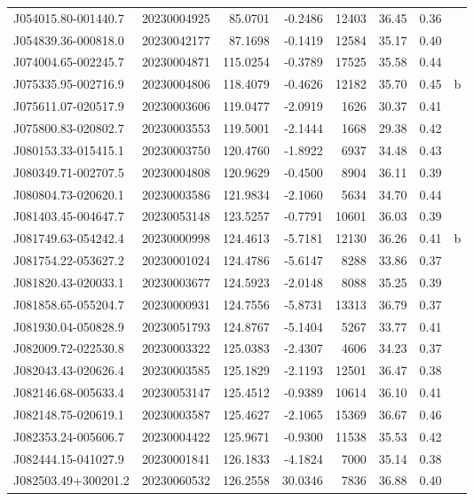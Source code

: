 \documentclass{article}
\begin{document}
\begin {longtable}{|l|l|r|r|r|r|r|l|}
 J054015.80-001440.7&  20230004925&   85.0701&   -0.2486& 12403& 36.45& 0.36&\\
 J054839.36-000818.0&  20230042177&   87.1698&   -0.1419& 12584& 35.17& 0.40&\\
 J074004.65-002245.7&  20230004871&  115.0254&   -0.3789& 17525& 35.58& 0.44&\\
 J075335.95-002716.9&  20230004806&  118.4079&   -0.4626& 12182& 35.70& 0.45&b\\%
 J075611.07-020517.9&  20230003606&  119.0477&   -2.0919&  1626& 30.37& 0.41&\\
 J075800.83-020802.7&  20230003553&  119.5001&   -2.1444&  1668& 29.38& 0.42&\\
 J080153.33-015415.1&  20230003750&  120.4760&   -1.8922&  6937& 34.48& 0.43&\\
 J080349.71-002707.5&  20230004808&  120.9629&   -0.4500&  8904& 36.11& 0.39&\\
 J080804.73-020620.1&  20230003586&  121.9834&   -2.1060&  5634& 34.70& 0.44&\\
 J081403.45-004647.7&  20230053148&  123.5257&   -0.7791& 10601& 36.03& 0.39&\\
 J081749.63-054242.4&  20230000998&  124.4613&   -5.7181& 12130& 36.26& 0.41&b\\%
 J081754.22-053627.2&  20230001024&  124.4786&   -5.6147&  8288& 33.86& 0.37&\\
 J081820.43-020033.1&  20230003677&  124.5923&   -2.0148&  8088& 35.25& 0.39&\\
 J081858.65-055204.7&  20230000931&  124.7556&   -5.8731& 13313& 36.79& 0.37&\\
 J081930.04-050828.9&  20230051793&  124.8767&   -5.1404&  5267& 33.77& 0.41&\\
 J082009.72-022530.8&  20230003322&  125.0383&   -2.4307&  4606& 34.23& 0.37&\\
 J082043.43-020626.4&  20230003585&  125.1829&   -2.1193& 12501& 36.47& 0.38&\\
 J082146.68-005633.4&  20230053147&  125.4512&   -0.9389& 10614& 36.10& 0.41&\\
 J082148.75-020619.1&  20230003587&  125.4627&   -2.1065& 15369& 36.67& 0.46&\\
 J082353.24-005606.7&  20230004422&  125.9671&   -0.9300& 11538& 35.53& 0.42&\\
 J082444.15-041027.9&  20230001841&  126.1833&   -4.1824&  7000& 35.14& 0.38&\\
 J082503.49+300201.2&  20230060532&  126.2558&   30.0346&  7836& 36.88& 0.40&\\

\end{longtable}
\end{document}
